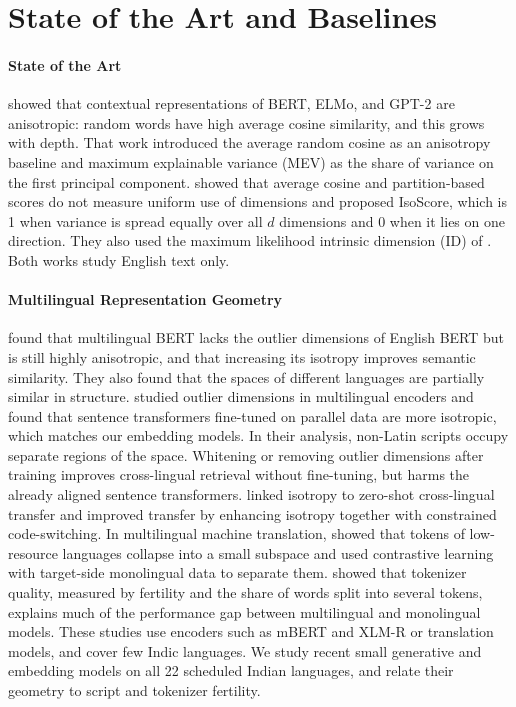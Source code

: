 \section{State of the Art and Baselines}
\label{sec:app1_baselines_sota}

\paragraph{State of the Art}
\citet{ethayarajh-2019-contextual} showed that contextual representations of BERT, ELMo, and GPT-2 are anisotropic: random words have high average cosine similarity, and this grows with depth. That work introduced the average random cosine as an anisotropy baseline and maximum explainable variance (MEV) as the share of variance on the first principal component. \citet{rudman-etal-2022-isoscore} showed that average cosine and partition-based scores do not measure uniform use of dimensions and proposed IsoScore, which is 1 when variance is spread equally over all $d$ dimensions and 0 when it lies on one direction. They also used the maximum likelihood intrinsic dimension (ID) of \citet{levina-bickel-2004-maximum}. Both works study English text only.

\paragraph{Multilingual Representation Geometry}
\citet{rajaee-pilehvar-2022-isotropy} found that multilingual BERT lacks the outlier dimensions of English BERT but is still highly anisotropic, and that increasing its isotropy improves semantic similarity. They also found that the spaces of different languages are partially similar in structure. \citet{hammerl-etal-2023-exploring} studied outlier dimensions in multilingual encoders and found that sentence transformers fine-tuned on parallel data are more isotropic, which matches our embedding models. In their analysis, non-Latin scripts occupy separate regions of the space. Whitening or removing outlier dimensions after training improves cross-lingual retrieval without fine-tuning, but harms the already aligned sentence transformers. \citet{ji-etal-2023-isotropic} linked isotropy to zero-shot cross-lingual transfer and improved transfer by enhancing isotropy together with constrained code-switching. In multilingual machine translation, \citet{lai-etal-2023-mitigating} showed that tokens of low-resource languages collapse into a small subspace and used contrastive learning with target-side monolingual data to separate them. \citet{rust-etal-2021-good} showed that tokenizer quality, measured by fertility and the share of words split into several tokens, explains much of the performance gap between multilingual and monolingual models. These studies use encoders such as mBERT and XLM-R or translation models, and cover few Indic languages. We study recent small generative and embedding models on all 22 scheduled Indian languages, and relate their geometry to script and tokenizer fertility.

